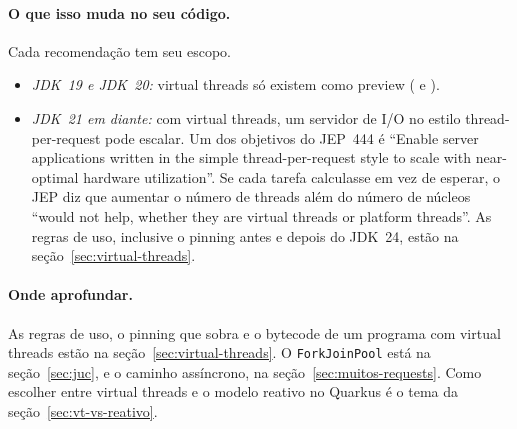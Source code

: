 

\paragraph{O que isso muda no seu código.}
Cada recomendação tem seu escopo.
\begin{itemize}
\item \emph{JDK~19 e JDK~20:} virtual threads só existem como preview
  ( e ).
\item \emph{JDK~21 em diante:} com virtual threads, um servidor de I/O
  no estilo thread-per-request pode escalar. Um dos objetivos do JEP~444 é
  \enquote{Enable server applications written in the simple
  thread-per-request style to scale with near-optimal hardware
  utilization}. Se cada tarefa calculasse em vez de esperar, o JEP diz
  que aumentar o número de threads além do número de núcleos
  \enquote{would not help, whether they are virtual threads or platform
  threads}. As regras de uso, inclusive o pinning antes e depois do
  JDK~24, estão na seção~\ref{sec:virtual-threads}.
\end{itemize}

\paragraph{Onde aprofundar.}
As regras de uso, o pinning que sobra e o bytecode de um programa com
virtual threads estão na seção~\ref{sec:virtual-threads}. O
\texttt{ForkJoinPool} está na seção~\ref{sec:juc}, e o caminho
assíncrono, na seção~\ref{sec:muitos-requests}. Como escolher entre
virtual threads e o modelo reativo no Quarkus é o tema da
seção~\ref{sec:vt-vs-reativo}.
